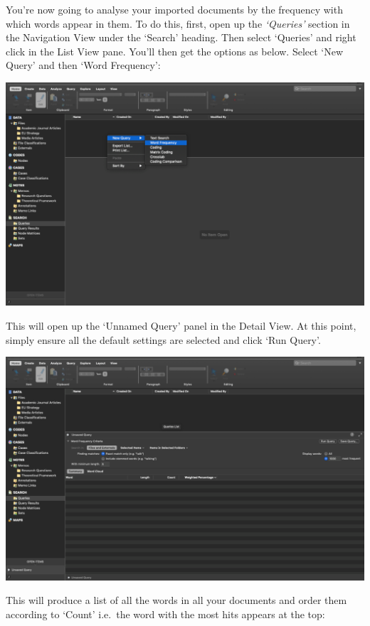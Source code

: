\documentclass[
]{book}
\begin{document}
You're now going to analyse your imported documents by the frequency with which words appear in them. To do this, first, open up the \emph{`Queries'} section in the Navigation View under the `Search' heading. Then select `Queries' and right click in the List View pane. You'll then get the options as below. Select `New Query' and then `Word Frequency':

\includegraphics{imgs/navigation_freq.png}

This will open up the `Unnamed Query' panel in the Detail View. At this point, simply ensure all the default settings are selected and click `Run Query'.

\includegraphics{imgs/run_query.png}

This will produce a list of all the words in all your documents and order them according to `Count' i.e.~the word with the most hits appears at the top:
\end{document}
